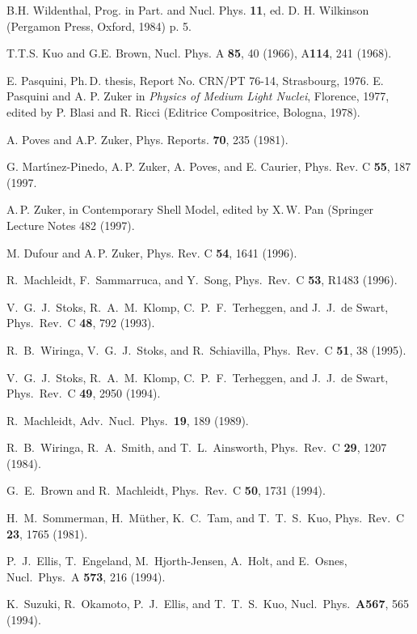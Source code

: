 \begin{multicols}{2}
\begin{references}
 B.H. Wildenthal, Prog. in Part. and Nucl. Phys.
{\bf 11}, ed. D. H. Wilkinson (Pergamon Press, Oxford, 1984) p. 5.

  T.T.S. Kuo and G.E. Brown,
 Nucl. Phys. A  {\bf 85}, 40 (1966), A{\bf 114}, 241  (1968).

 E. Pasquini, Ph.\,D. thesis, Report No. CRN/PT
  76-14, Strasbourg, 1976. E. Pasquini and A. P. Zuker in {\it Physics
    of Medium Light Nuclei}, Florence, 1977, edited by P. Blasi and R.
  Ricci (Editrice Compositrice, Bologna, 1978).

  A. Poves and A.P. Zuker,
Phys. Reports. {\bf 70}, 235 (1981).

  G. Mart\'{\i}nez-Pinedo, A.\,P.  Zuker, A. Poves, and E. Caurier,
  Phys. Rev. C {\bf 55}, 187 (1997.

A.\,P. Zuker, in Contemporary Shell Model, edited by X.\,W. Pan
(Springer Lecture Notes 482 (1997).

    M. Dufour and A.\,P. Zuker, Phys. Rev. C {\bf 54}, 1641 (1996).

 R.\ Machleidt, F.\ Sammarruca, and Y.\ Song,
Phys.\ Rev.\ C {\bf 53}, R1483  (1996).

V.\ G.\ J.\ Stoks, R.\ A.\ M.\ Klomp, C.\ P.\ F.\ Terheggen, and J.\ J.\
de Swart, Phys.\ Rev.\ C {\bf 48}, 792 (1993).

R.\ B.\ Wiringa, V.\ G.\ J.\ Stoks, and R.\ Schiavilla, Phys.\ Rev.\
C {\bf 51}, 38 (1995).

V.\ G.\ J.\ Stoks, R.\ A.\ M.\ Klomp, C.\ P.\ F.\ Terheggen, and J.\ J.\
de Swart, Phys.\ Rev.\ C {\bf 49}, 2950 (1994).

\bibitem{mac89}
R.\ Machleidt, Adv.\ Nucl.\ Phys.\ {\bf 19}, 189 (1989).

\bibitem{v14}
R.\ B.\ Wiringa, R.\ A.\ Smith, and T.\ L.\ Ainsworth,
Phys.\ Rev.\ C {\bf 29}, 1207 (1984).

\bibitem{bm95} G.\ E.\ Brown and R.\ Machleidt,
Phys.\ Rev.\ C {\bf 50}, 1731 (1994).



H.\ M.\ Sommerman, H.\ M\"uther, K.\ C.\ Tam, and T.\ T.\ S.\ Kuo,
Phys.\ Rev.\ C {\bf 23}, 1765 (1981).

\bibitem{converge93} P.\ J.\ Ellis, T.\ Engeland, M.\ Hjorth-Jensen,
A.\ Holt, and E.\ Osnes, Nucl.\ Phys.\ A {\bf 573}, 216 (1994).

\bibitem{kenji} K.\ Suzuki, R.\ Okamoto, P.\ J.\ Ellis, and
T.\ T.\ S.\ Kuo, Nucl.\ Phys.\  {\bf A567}, 565 (1994).


\end{references}
\end{multicols}

